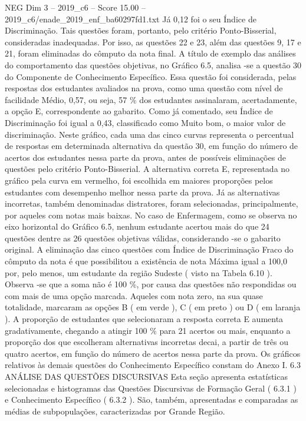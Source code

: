 \begin{textsample}{NEG Dim 3 – 2019\_c6 – Score 15.00 – 2019\_c6/enade\_2019\_enf\_ba60297fd1.txt}
Já 0,12 foi o seu Índice de Discriminação.
Tais questões foram, portanto, pelo critério Ponto-Bisserial, consideradas inadequadas.
Por isso, as questões 22 e 23, além das questões 9, 17 e 21, foram eliminadas do cômputo da nota final.
A título de exemplo das análises do comportamento das questões objetivas, no Gráfico 6.5, analisa -se a questão 30 do Componente de Conhecimento Específico.
Essa questão foi considerada, pelas respostas dos estudantes avaliados na prova, como uma questão com nível de facilidade Médio, 0,57, ou seja, 57 \% dos estudantes assinalaram, acertadamente, a opção E, correspondente ao gabarito.
Como já comentado, seu Índice de Discriminação foi igual a 0,43, classificado como Muito bom, o maior valor de discriminação.
Neste gráfico, cada uma das cinco curvas representa o percentual de respostas em determinada alternativa da questão 30, em função do número de acertos dos estudantes nessa parte da prova, antes de possíveis eliminações de questões pelo critério Ponto-Bisserial.
A alternativa correta E, representada no gráfico pela curva em vermelho, foi escolhida em maiores proporções pelos estudantes com desempenho melhor nessa parte da prova.
Já as alternativas incorretas, também denominadas distratores, foram selecionadas, principalmente, por aqueles com notas mais baixas.
No caso de Enfermagem, como se observa no eixo horizontal do Gráfico 6.5, nenhum estudante acertou mais do que 24 questões dentre as 26 questões objetivas válidas, considerando -se o gabarito original.
A eliminação das cinco questões com Índice de Discriminação Fraco do cômputo da nota é que possibilitou a existência de nota Máxima igual a 100,0 por, pelo menos, um estudante da região Sudeste ( visto na Tabela 6.10 ).
Observa -se que a soma não é 100 \%, por causa das questões não respondidas ou com mais de uma opção marcada.
Aqueles com nota zero, na sua quase totalidade, marcaram as opções B ( em verde ), C ( em preto ) ou D ( em laranja ).
A proporção de estudantes que selecionaram a resposta correta E aumenta gradativamente, chegando a atingir 100 \% para 21 acertos ou mais, enquanto a proporção dos que escolheram alternativas incorretas decai, a partir de três ou quatro acertos, em função do número de acertos nessa parte da prova.
Os gráficos relativos às demais questões do Conhecimento Específico constam do Anexo I. 6.3 ANÁLISE DAS QUESTÕES DISCURSIVAS Esta seção apresenta estatísticas selecionadas e histogramas das Questões Discursivas de Formação Geral ( 6.3.1 ) e Conhecimento Específico ( 6.3.2 ).
São, também, apresentadas e comparadas as médias de subpopulações, caracterizadas por Grande Região.

\end{textsample}
